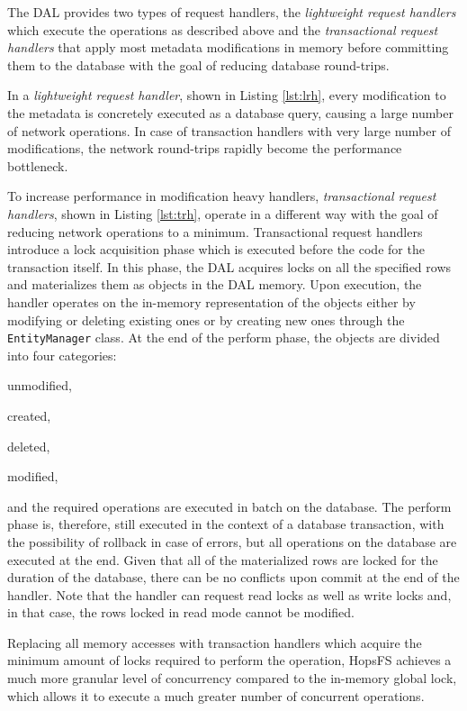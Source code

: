 The DAL provides two types of request handlers, the \emph{lightweight request handlers} which execute the operations as described above and the \emph{transactional request handlers} that apply most metadata modifications in memory before committing them to the database with the goal of reducing database round-trips.

In a \emph{lightweight request handler}, shown in Listing \ref{lst:lrh}, every modification to the metadata is concretely executed as a database query, causing a large number of network operations.
In case of transaction handlers with very large number of modifications, the network round-trips rapidly become the performance bottleneck.

To increase performance in modification heavy handlers, \emph{transactional request handlers}, shown in Listing \ref{lst:trh}, operate in a different way with the goal of reducing network operations to a minimum.
Transactional request handlers introduce a lock acquisition phase which is executed before the code for the transaction itself.
In this phase, the DAL acquires locks on all the specified rows and materializes them as objects in the DAL memory.
Upon execution, the handler operates on the in-memory representation of the objects either by modifying or deleting existing ones or by creating new ones through the \texttt{EntityManager} class.
At the end of the perform phase, the objects are divided into four categories:
\begin{inparaenum}[1)]
    \item unmodified,
    \item created,
    \item deleted,
    \item modified,
\end{inparaenum}
and the required operations are executed in batch on the database.
The perform phase is, therefore, still executed in the context of a database transaction, with the possibility of rollback in case of errors, but all operations on the database are executed at the end.
Given that all of the materialized rows are locked for the duration of the database, there can be no conflicts upon commit at the end of the handler.
Note that the handler can request read locks as well as write locks and, in that case, the rows locked in read mode cannot be modified.

Replacing all memory accesses with transaction handlers which acquire the minimum amount of locks required to perform the operation, HopsFS achieves a much more granular level of concurrency compared to the in-memory global lock, which allows it to execute a much greater number of concurrent operations.


